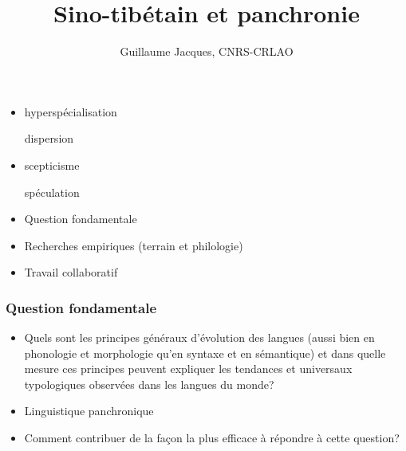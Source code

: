 \documentclass[xcolor=table]{beamer}
\newcommand{\bleu}[1]{{\color{blue}#1}}
\begin{document}
 
\begin{frame} 

\title{Sino-tibétain et panchronie} 

 \author{Guillaume Jacques, CNRS-CRLAO  }
\maketitle
 \end{frame} 

\begin{frame} 


\begin{itemize}[<+->]
\item hyperspécialisation
dispersion

\item scepticisme
spéculation

\end{itemize}
 \end{frame} 
 
\begin{frame} 

\begin{itemize}[<+->] 
\item Question fondamentale
\item Recherches empiriques (terrain et philologie)
\item Travail collaboratif
\end{itemize}
  \end{frame} 

\begin{frame} 
\frametitle{Question fondamentale}

\begin{itemize}[<+->] 
\item Quels sont les \bleu{principes généraux d'évolution des langues} (aussi bien en phonologie et morphologie qu'en syntaxe et en sémantique) et dans quelle mesure ces principes peuvent expliquer les tendances et universaux typologiques observées dans les langues du monde?
\item Linguistique \bleu{panchronique}
\item Comment contribuer de la façon la plus efficace à répondre à cette question?
\end{itemize}
  \end{frame} 
  
\end{document}
